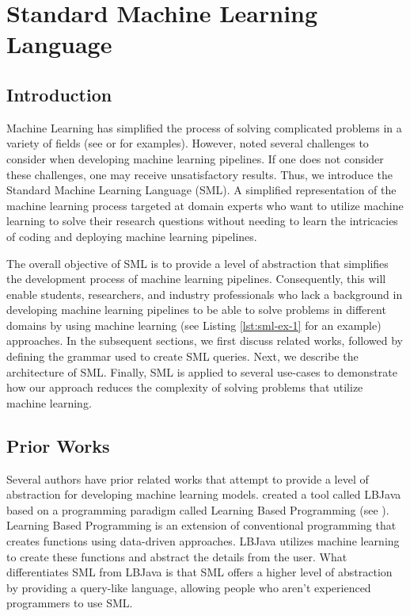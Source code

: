 \chapter{Standard Machine Learning Language} \label{Chapter:SML}

\section{Introduction}
\label{Introduction}

Machine Learning has simplified the process of solving complicated problems in a variety of fields (see \cite{ML-UseCase1} or \cite{Monahan} for examples).  However, \cite{pedros:fewUsefulThings} noted several challenges to consider when developing machine learning pipelines.  If one does not consider these challenges, one may receive unsatisfactory results.  Thus, we introduce the Standard Machine Learning Language (SML). A simplified representation of the machine learning process targeted at domain experts who want to utilize machine learning to solve their research questions without needing to learn the intricacies of coding and deploying machine learning pipelines.

The overall objective of SML is to provide a level of abstraction that simplifies the development process of machine learning pipelines.  Consequently, this will enable students, researchers, and industry professionals who lack a background in developing machine learning pipelines to be able to solve problems in different domains by using machine learning (see Listing \ref{lst:sml-ex-1} for an example) approaches.  In the subsequent sections, we first discuss related works,  followed by defining the grammar used to create SML queries. Next, we describe the architecture of SML. Finally, SML is applied to several use-cases to demonstrate how our approach reduces the complexity of solving problems that utilize machine learning.

\section{Prior Works}
\label{SML:PriorWorks}

Several authors have prior related works that attempt to provide a level of abstraction for developing machine learning models.  \cite{RizzoloRo10} created a tool called LBJava based on a programming paradigm called Learning Based Programming (see \cite{Roth05}). Learning Based Programming is an extension of conventional programming that creates functions using data-driven approaches.  LBJava utilizes machine learning to create these functions and abstract the details from the user.  What differentiates SML from LBJava is that SML offers a higher level of abstraction by providing a query-like language, allowing people who aren't experienced programmers to use SML.  

